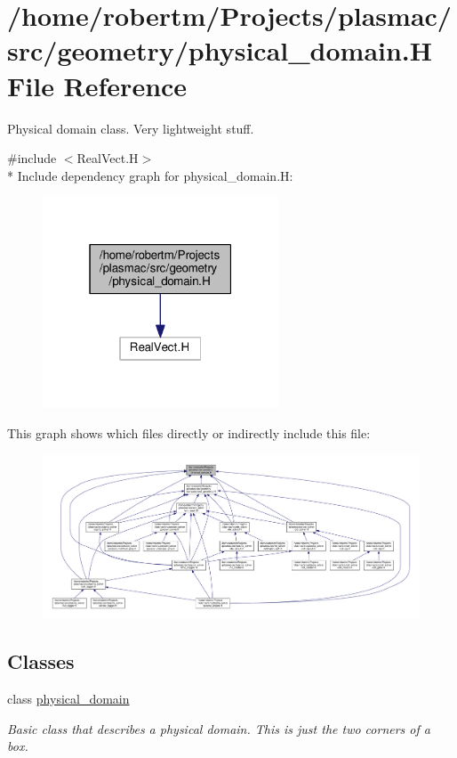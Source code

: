\hypertarget{physical__domain_8H}{}\section{/home/robertm/\+Projects/plasmac/src/geometry/physical\+\_\+domain.H File Reference}
\label{physical__domain_8H}


Physical domain class. Very lightweight stuff.  


{\ttfamily \#include $<$Real\+Vect.\+H$>$}\\*
Include dependency graph for physical\+\_\+domain.\+H\+:\nopagebreak
\begin{figure}[H]
\begin{center}
\leavevmode
\includegraphics[width=199pt]{physical__domain_8H__incl}
\end{center}
\end{figure}
This graph shows which files directly or indirectly include this file\+:\nopagebreak
\begin{figure}[H]
\begin{center}
\leavevmode
\includegraphics[width=350pt]{physical__domain_8H__dep__incl}
\end{center}
\end{figure}
\subsection*{Classes}
\begin{DoxyCompactItemize}
\item 
class \hyperlink{classphysical__domain}{physical\+\_\+domain}
\begin{DoxyCompactList}\small\item\em Basic class that describes a physical domain. This is just the two corners of a box. \end{DoxyCompactList}\end{DoxyCompactItemize}


